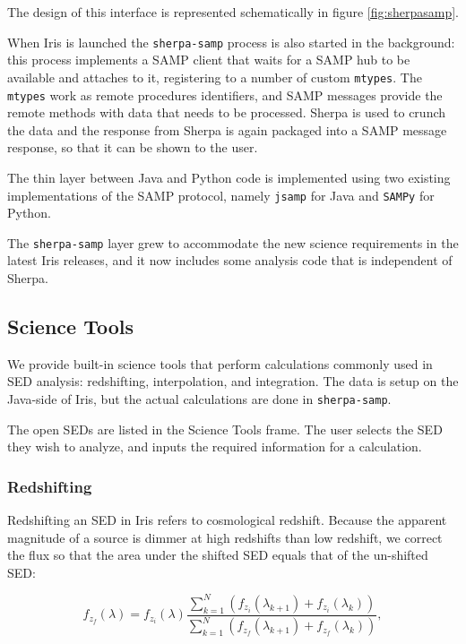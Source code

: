 \documentclass[5p]{elsarticle}
\begin{document}
The design of this interface is represented schematically in figure \ref{fig:sherpasamp}.

When Iris is launched the \verb|sherpa-samp| process is also started in the background: this process implements a SAMP client that waits for a SAMP hub to be available and attaches to it, registering to a number of custom \verb|mtypes|. The \verb|mtypes| work as remote procedures identifiers, and SAMP messages provide the remote methods with data that needs to be processed. Sherpa is used to crunch the data and the response from Sherpa is again packaged into a SAMP message response, so that it can be shown to the user.

The thin layer between Java and Python code is implemented using two existing implementations of the SAMP protocol, namely \verb|jsamp| for Java and \verb|SAMPy| for Python.

The \verb|sherpa-samp| layer grew to accommodate the new science requirements in the latest Iris releases, and it now includes some analysis code that is independent of Sherpa.

\subsection{Science Tools}
We provide built-in science tools that perform calculations commonly used in SED analysis: redshifting, interpolation, and integration. The data is setup on the Java-side of Iris, but the actual calculations are done in \verb|sherpa-samp|.

The open SEDs are listed in the Science Tools frame. The user selects the SED they wish to analyze, and inputs the required information for a calculation.

\subsubsection{Redshifting}
Redshifting an SED in Iris refers to cosmological redshift. Because the apparent magnitude of a source is dimmer at high redshifts than low redshift, we correct the flux so that the area under the shifted SED equals that of the un-shifted SED:

\begin{equation} \label{eq:redshift}
f_{z_{f}}(\lambda) = f_{z_{i}}(\lambda) \frac{\sum_{k=1}^N (f_{z_{i}}(\lambda_{k+1})+f_{z_{i}}(\lambda_{k}))}{\sum_{k=1}^N (f_{z_{f}}(\lambda_{k+1})+f_{z_{f}}(\lambda_{k}))},
\end{equation}
\end{document}
